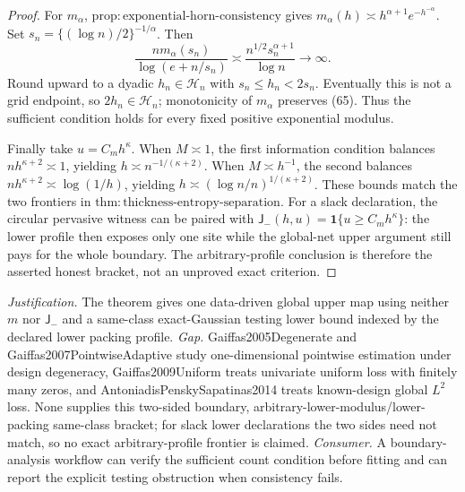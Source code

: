 \documentclass{article}
\begin{document}
\begin{proof}
For \(m_\alpha\),
\(\mathrm{prop:exponential\text{-}horn\text{-}consistency}\) gives
\(m_\alpha(h)\asymp h^{\alpha+1}e^{-h^{-\alpha}}\).  Set
\(s_n=\{(\log n)/2\}^{-1/\alpha}\).  Then
\[
 \frac{nm_\alpha(s_n)}{\log(e+n/s_n)}
 \asymp\frac{n^{1/2}s_n^{\alpha+1}}{\log n}\longrightarrow\infty.
 \tag{65}
\]
Round upward to a dyadic \(h_n\in\mathcal H_n\) with
\(s_n\le h_n<2s_n\).  Eventually this is not a grid endpoint, so
\(2h_n\in\mathcal H_n\); monotonicity of \(m_\alpha\) preserves (65).
Thus the sufficient condition holds for every fixed positive exponential
modulus.

Finally take \(u=C_mh^\kappa\).  When \(M\asymp1\), the first information
condition balances \(nh^{\kappa+2}\asymp1\), yielding
\(h\asymp n^{-1/(\kappa+2)}\).  When \(M\asymp h^{-1}\), the second
balances \(nh^{\kappa+2}\asymp\log(1/h)\), yielding
\(h\asymp(\log n/n)^{1/(\kappa+2)}\).  These bounds match the two
frontiers in \(\mathrm{thm:thickness\text{-}entropy\text{-}separation}\).
For a slack declaration, the circular pervasive witness can be paired
with \(\mathsf J_{-}(h,u)=\mathbf1\{u\ge C_mh^\kappa\}\): the lower
profile then exposes only one site while the global-net upper argument
still pays for the whole boundary.  The arbitrary-profile conclusion is
therefore the asserted honest bracket, not an unproved exact criterion.
\end{proof}
\par\smallskip\noindent \textit{Justification.} The theorem gives one data-driven global upper map using neither \(m\) nor \(\mathsf J_{-}\) and a same-class exact-Gaussian testing lower bound indexed by the declared lower packing profile. \textit{Gap.} Gaiffas2005Degenerate and Gaiffas2007PointwiseAdaptive study one-dimensional pointwise estimation under design degeneracy, Gaiffas2009Uniform treats univariate uniform loss with finitely many zeros, and AntoniadisPenskySapatinas2014 treats known-design global \(L^2\) loss. None supplies this two-sided boundary, arbitrary-lower-modulus/lower-packing same-class bracket; for slack lower declarations the two sides need not match, so no exact arbitrary-profile frontier is claimed. \textit{Consumer.} A boundary-analysis workflow can verify the sufficient count condition before fitting and can report the explicit testing obstruction when consistency fails.
\end{document}
